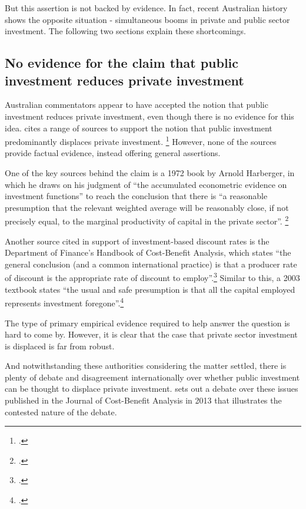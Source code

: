 But this assertion is not backed by evidence. In fact, recent Australian history shows the opposite situation - simultaneous booms in private and public sector investment. The following two sections explain these shortcomings.

\subsection{No evidence for the claim that public investment reduces private investment}

Australian commentators appear to have accepted the notion that public investment reduces private investment, even though there is no evidence for this idea. \textcite{Harrison-Valuing-the-Future} cites a range of sources to support the notion that public investment predominantly displaces private investment.%
    \footcites[][32]{Harrison-Valuing-the-Future}[][xx - check - for alternative perspective]{Boardman-Cost-Benefit-Analysis-4th-Edition}
However, none of the sources provide factual evidence, instead offering general assertions.

One of the key sources behind the claim is a 1972 book by Arnold Harberger, in which he draws on his judgment of “the accumulated econometric evidence on investment functions” to reach the conclusion that there is “a reasonable presumption that the relevant weighted average will be reasonably close, if not precisely equal, to the marginal productivity of capital in the private sector”.%
    \footcite[][108]{Harberger-Project-Evaluation-1972}  

Another source cited in support of investment-based discount rates is the Department of Finance’s Handbook of Cost-Benefit Analysis, which states “the general conclusion (and a common international practice) is that a producer rate of discount is the appropriate rate of discount to employ”.\footcite[][XX]{Dept-Finance-2006-Handbook-of-CBA}  Similar to this, a 2003 textbook states “the usual and safe presumption is that all the capital employed represents investment foregone”.\footcite[][XX]{Abelson-2003-public-economics}  

The type of primary empirical evidence required to help answer the question is hard to come by. However, it is clear that the case that private sector investment is displaced is far from robust. 

And notwithstanding these authorities considering the matter settled, there is plenty of debate and disagreement internationally over whether public investment can be thought to displace private investment.  sets out a debate over these issues published in the Journal of Cost-Benefit Analysis in 2013 that illustrates the contested nature of the debate.

